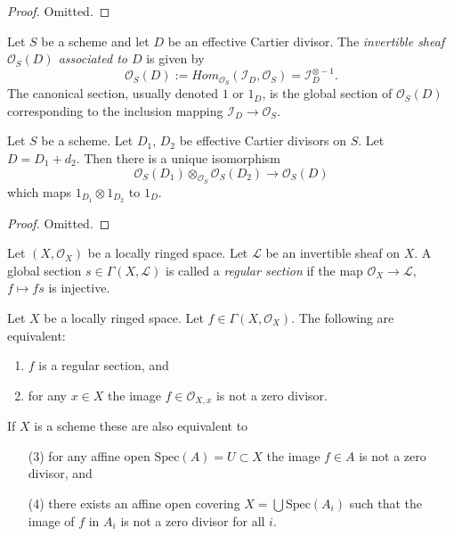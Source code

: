 \begin{proof}
Omitted.
\end{proof}

\begin{definition}
\label{definition-invertible-sheaf-effective-Cartier-divisor}
Let $S$ be a scheme and let $D$ be an effective Cartier divisor.
The {\it invertible sheaf $\mathcal{O}_S(D)$ associated to $D$}
is given by
$$
\mathcal{O}_S(D) :=
\textit{Hom}_{\mathcal{O}_S}(\mathcal{I}_D, \mathcal{O}_S) =
\mathcal{I}_D^{\otimes -1}.
$$
The canonical section, usually denoted $1$ or $1_D$, is the
global section of $\mathcal{O}_S(D)$ corresponding to
the inclusion mapping $\mathcal{I}_D \to \mathcal{O}_S$.
\end{definition}

\begin{lemma}
\label{lemma-invertible-sheaf-sum-effective-Cartier-divisors}
Let $S$ be a scheme.
Let $D_1$, $D_2$ be effective Cartier divisors on $S$.
Let $D = D_1 + d_2$.
Then there is a unique isomorphism
$$
\mathcal{O}_S(D_1) \otimes_{\mathcal{O}_S} \mathcal{O}_S(D_2)
\longrightarrow
\mathcal{O}_S(D)
$$
which maps $1_{D_1} \otimes 1_{D_2}$ to $1_D$.
\end{lemma}

\begin{proof}
Omitted.
\end{proof}

\begin{definition}
\label{definition-regular-section}
Let $(X, \mathcal{O}_X)$ be a locally ringed space.
Let $\mathcal{L}$ be an invertible sheaf on $X$.
A global section $s \in \Gamma(X, \mathcal{L})$ is called a
{\it regular section} if the map $\mathcal{O}_X \to \mathcal{L}$,
$f \mapsto fs$ is injective.
\end{definition}

\begin{lemma}
\label{lemma-regular-section-structure-sheaf}
Let $X$ be a locally ringed space. Let $f \in \Gamma(X, \mathcal{O}_X)$.
The following are equivalent:
\begin{enumerate}
\item $f$ is a regular section, and
\item for any $x \in X$ the image $f \in \mathcal{O}_{X, x}$
is not a zero divisor.
\end{enumerate}
If $X$ is a scheme these are also equivalent to
\begin{enumerate}
\item[(3)] for any affine open $\text{Spec}(A) = U \subset X$
the image $f \in A$ is not a zero divisor, and
\item[(4)] there exists an affine open covering
$X = \bigcup \text{Spec}(A_i)$ such that
the image of $f$ in $A_i$ is not a zero divisor for all $i$.
\end{enumerate}
\end{lemma}

